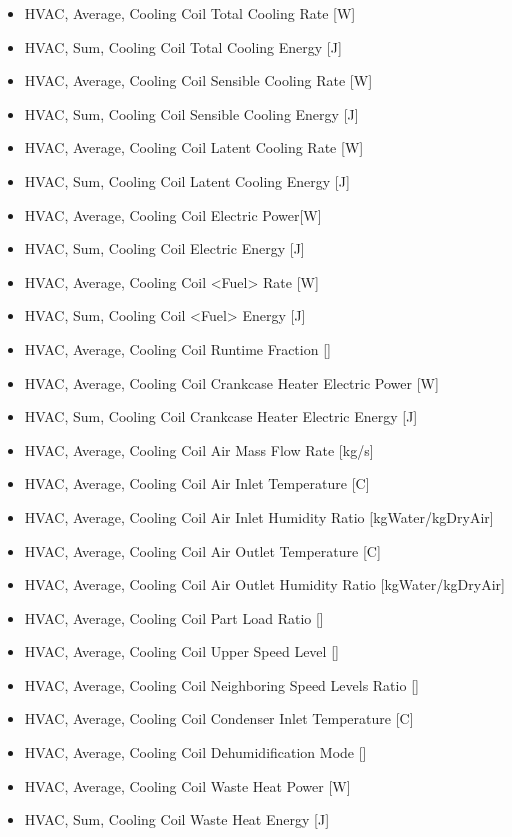 \begin{itemize}
\item HVAC, Average, Cooling Coil Total Cooling Rate {[}W{]}
\item HVAC, Sum, Cooling Coil Total Cooling Energy {[}J{]}
\item HVAC, Average, Cooling Coil Sensible Cooling Rate {[}W{]}
\item HVAC, Sum, Cooling Coil Sensible Cooling Energy {[}J{]}
\item HVAC, Average, Cooling Coil Latent Cooling Rate {[}W{]}
\item HVAC, Sum, Cooling Coil Latent Cooling Energy {[}J{]}
\item HVAC, Average, Cooling Coil Electric Power{[}W{]}
\item HVAC, Sum, Cooling Coil Electric Energy {[}J{]}
\item HVAC, Average, Cooling Coil <Fuel> Rate {[}W{]}
\item HVAC, Sum, Cooling Coil <Fuel> Energy {[}J{]}
\item HVAC, Average, Cooling Coil Runtime Fraction {[]}
\item HVAC, Average, Cooling Coil Crankcase Heater Electric Power {[}W{]}
\item HVAC, Sum, Cooling Coil Crankcase Heater Electric Energy {[}J{]}
\item HVAC, Average, Cooling Coil Air Mass Flow Rate {[}kg/s{]}
\item HVAC, Average, Cooling Coil Air Inlet Temperature {[}C{]}
\item HVAC, Average, Cooling Coil Air Inlet Humidity Ratio {[}kgWater/kgDryAir{]}
\item HVAC, Average, Cooling Coil Air Outlet Temperature {[}C{]}
\item HVAC, Average, Cooling Coil Air Outlet Humidity Ratio {[}kgWater/kgDryAir{]}
\item HVAC, Average, Cooling Coil Part Load Ratio {[]}
\item HVAC, Average, Cooling Coil Upper Speed Level {[]}
\item HVAC, Average, Cooling Coil Neighboring Speed Levels Ratio {[]}
\item HVAC, Average, Cooling Coil Condenser Inlet Temperature {[}C{]}
\item HVAC, Average, Cooling Coil Dehumidification Mode {[]}
\item HVAC, Average, Cooling Coil Waste Heat Power {[}W{]}
\item HVAC, Sum, Cooling Coil Waste Heat Energy {[}J{]}

\end{itemize}
